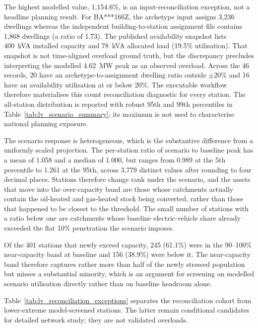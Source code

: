 \documentclass[preprint,12pt]{elsarticle}
\begin{document}
The highest modelled value, 1,154.6\%, is an input-reconciliation exception,
not a headline planning result. For BA***166Z, the archetype input assigns
3,236 dwellings whereas the independent building-to-station assignment file
contains 1,868 dwellings (a ratio of 1.73). The published availability
snapshot lists 400~kVA installed capacity and 78~kVA allocated load (19.5\%
utilisation). That snapshot is not time-aligned overload ground truth, but
the discrepancy precludes interpreting the modelled 4.62~MW peak as an
observed overload. Across the 46 records, 20 have an archetype-to-assignment
dwelling ratio outside $\pm20\%$ and 16 have an availability utilisation at
or below 20\%. The executable workflow therefore materialises this count
reconciliation diagnostic for every station. The all-station distribution is
reported with robust 95th and 99th percentiles in
Table~\ref{tab:lv_scenario_summary}; its maximum is not used to characterise
national planning exposure.

The scenario response is heterogeneous, which is the substantive difference
from a uniformly scaled projection.
The per-station ratio of scenario to baseline peak has a mean of 1.058 and a
median of 1.000, but ranges from 0.989 at the 5th percentile to 1.261 at the
95th, across 3,779 distinct values after rounding to four decimal places.
Stations therefore change rank under the scenario, and the assets that move
into the over-capacity band are those whose catchments actually contain the
oil-heated and gas-heated stock being converted, rather than those that
happened to be closest to the threshold.
The small number of stations with a ratio below one are catchments whose
baseline electric-vehicle share already exceeded the flat 10\% penetration
the scenario imposes.

Of the 401 stations that newly exceed capacity, 245 (61.1\%) were in the
90--100\% near-capacity band at baseline and 156 (38.9\%) were below it.
The near-capacity band therefore captures rather more than half of the
newly stressed population but misses a substantial minority, which is an
argument for screening on modelled scenario utilisation directly rather than
on baseline headroom alone.

Table~\ref{tab:lv_reconciliation_exceptions} separates the reconciliation
cohort from lower-extreme model-screened stations. The latter remain
conditional candidates for detailed network study; they are not validated
overloads.
\end{document}
